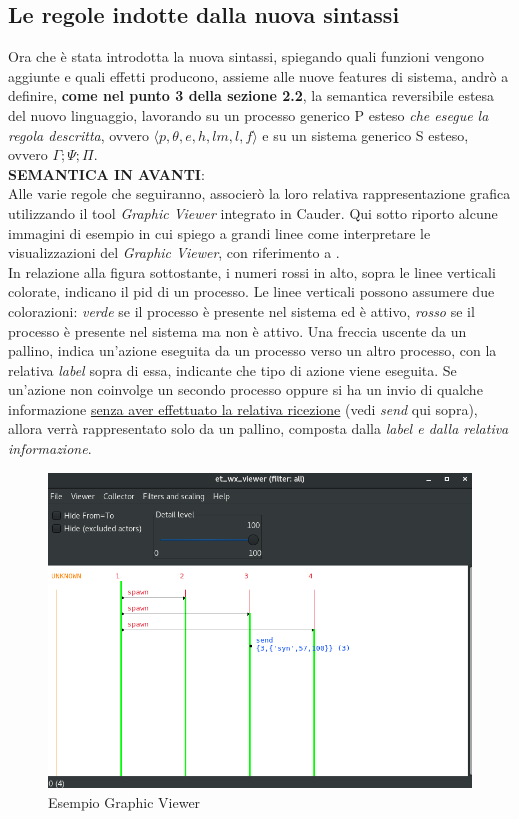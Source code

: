 \documentclass[Contributo.tex]{subfiles}
\begin{document}
\subsection{Le regole indotte dalla nuova sintassi}
Ora che è stata introdotta la nuova sintassi, spiegando quali funzioni vengono aggiunte e quali effetti producono, assieme alle nuove features di sistema, andrò a definire, \textbf{come nel punto 3 della sezione 2.2}, la semantica reversibile estesa del nuovo linguaggio, lavorando su un processo generico P esteso \textit{che esegue la regola descritta}, ovvero $\displaystyle \langle p,\theta,e,h,lm,l,f \rangle$ e su un sistema generico S esteso, ovvero $\displaystyle \Gamma;\Psi;\Pi$.\\
\textbf{SEMANTICA IN AVANTI}:\\
	Alle varie regole che seguiranno, associerò la loro relativa rappresentazione grafica utilizzando il tool \textit{Graphic Viewer} integrato in Cauder. Qui sotto riporto alcune immagini di esempio in cui spiego a grandi linee come interpretare le visualizzazioni del \textit{Graphic Viewer}, con riferimento a \cite{et}.\\
	In relazione alla figura sottostante, i numeri rossi in alto, sopra le linee verticali colorate, indicano il pid di un processo. Le linee verticali possono assumere due colorazioni: \textit{verde} se il processo è presente nel sistema ed è attivo, \textit{rosso} se il processo è presente nel sistema ma non è attivo. Una freccia uscente da un pallino, indica un'azione eseguita da un processo verso un altro processo, con la relativa \textit{label} sopra di essa, indicante che tipo di azione viene eseguita. Se un'azione non coinvolge un secondo processo oppure si ha un invio di qualche informazione \underline{senza aver effettuato la relativa ricezione} (vedi \textit{send} qui sopra), allora verrà rappresentato solo da un pallino, composta dalla \textit{label e dalla relativa informazione}.
	\begin{figure}[H]
		\includegraphics[scale=0.5]{./LavoroLuca/EstensioneCauder/Imgs/GraphicViewerSend}
		\caption{Esempio Graphic Viewer}
		\label{fig5}
	\end{figure}
\end{document}
